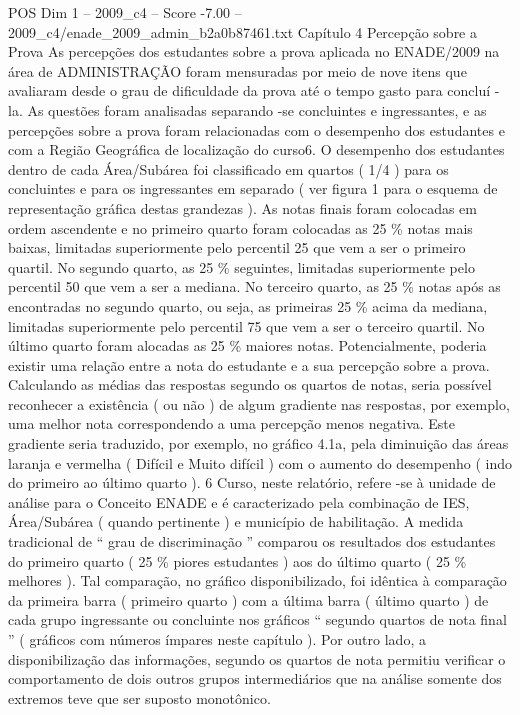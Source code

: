 \begin{textsample}{POS Dim 1 – 2009\_c4 – Score -7.00 – 2009\_c4/enade\_2009\_admin\_b2a0b87461.txt}  \label{ex:f1_pos_420}
Capítulo 4 Percepção sobre a Prova As percepções dos estudantes sobre a prova aplicada no ENADE/2009 na área de ADMINISTRAÇÃO foram mensuradas por meio de nove itens que avaliaram desde o grau de dificuldade da prova até o tempo gasto para concluí -la.
As questões foram analisadas separando -se concluintes e ingressantes, e as percepções sobre a prova foram relacionadas com o desempenho dos estudantes e com a Região Geográfica de localização do curso6.
O desempenho dos estudantes dentro de cada Área/Subárea foi classificado em quartos ( 1/4 ) para os concluintes e para os ingressantes em separado ( ver figura 1 para o esquema de representação gráfica destas grandezas ).
As notas finais foram colocadas em ordem ascendente e no primeiro quarto foram colocadas as 25 \% notas mais baixas, limitadas superiormente pelo percentil 25 que vem a ser o primeiro quartil.
No segundo quarto, as 25 \% seguintes, limitadas superiormente pelo percentil 50 que vem a ser a mediana.
No terceiro quarto, as 25 \% notas após as encontradas no segundo quarto, ou seja, as primeiras 25 \% acima da mediana, limitadas superiormente pelo percentil 75 que vem a ser o terceiro quartil.
No último quarto foram alocadas as 25 \% maiores notas.
Potencialmente, poderia existir uma relação entre a nota do estudante e a sua percepção sobre a prova.
Calculando as médias das respostas segundo os quartos de notas, seria possível reconhecer a existência ( ou não ) de algum gradiente nas respostas, por exemplo, uma melhor nota correspondendo a uma percepção menos negativa.
Este gradiente seria traduzido, por exemplo, no gráfico 4.1a, pela diminuição das áreas laranja e vermelha ( Difícil e Muito difícil ) com o aumento do desempenho ( indo do primeiro ao último quarto ). 6 Curso, neste relatório, refere -se à unidade de análise para o Conceito ENADE e é caracterizado pela combinação de IES, Área/Subárea ( quando pertinente ) e município de habilitação.
A medida tradicional de “ grau de discriminação ” comparou os resultados dos estudantes do primeiro quarto ( 25 \% piores estudantes ) aos do último quarto ( 25 \% melhores ).
Tal comparação, no gráfico disponibilizado, foi idêntica à comparação da primeira barra ( primeiro quarto ) com a última barra ( último quarto ) de cada grupo ingressante ou concluinte nos gráficos “ segundo quartos de nota final ” ( gráficos com números ímpares neste capítulo ).
Por outro lado, a disponibilização das informações, segundo os quartos de nota permitiu verificar o comportamento de dois outros grupos intermediários que na análise somente dos extremos teve que ser suposto monotônico.

\end{textsample}
